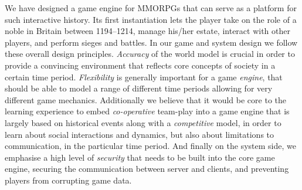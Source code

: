 \documentclass[11pt]{article}
\begin{document}
We have designed a game engine for  MMORPGs that can serve as a platform for such interactive history.
Its first instantiation  lets the player take on  the role of a noble in Britain
between 1194--1214, manage his/her estate, interact with other players, and perform sieges and battles.
%
In our game and system design we follow these overall design principles. \emph{Accuracy\/}
of the  world model is crucial in order to provide a convincing environment that reflects
core concepts of society in a certain time period. \emph{Flexibility} is generally important
for a  game \emph{engine}, that should be able to model a range of different time periods
allowing for very different game mechanics. Additionally we believe that it would be core to the learning experience 
to embed \emph{co-operative} team-play into a game engine that is largely based on  historical  events along with  a \emph{competitive} model,
in order to learn about social interactions and dynamics, but also about limitations to communication,
in the particular time period. And finally on the system side, we emphasise a high level
of \emph{security} that needs to be built into the core game engine, securing the communication 
between server and clients, and preventing players from corrupting  game data.


\end{document}
